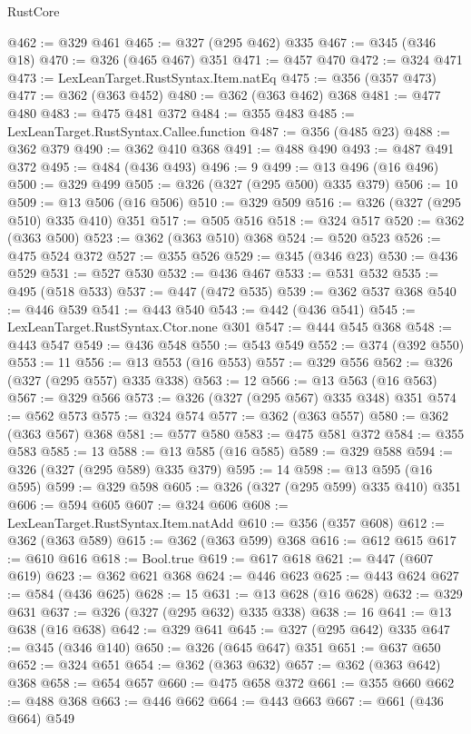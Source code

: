 \begin{lexlean}{RustCore}
\begin{coremodule}
@462 := @329 @461
@465 := @327 (@295 @462) @335
@467 := @345 (@346 @18)
@470 := @326 (@465 @467) @351
@471 := @457 @470
@472 := @324 @471
@473 := LexLeanTarget.RustSyntax.Item.natEq
@475 := @356 (@357 @473)
@477 := @362 (@363 @452)
@480 := @362 (@363 @462) @368
@481 := @477 @480
@483 := @475 @481 @372
@484 := @355 @483
@485 := LexLeanTarget.RustSyntax.Callee.function
@487 := @356 (@485 @23)
@488 := @362 @379
@490 := @362 @410 @368
@491 := @488 @490
@493 := @487 @491 @372
@495 := @484 (@436 @493)
@496 := 9
@499 := @13 @496 (@16 @496)
@500 := @329 @499
@505 := @326 (@327 (@295 @500) @335 @379)
@506 := 10
@509 := @13 @506 (@16 @506)
@510 := @329 @509
@516 := @326 (@327 (@295 @510) @335 @410) @351
@517 := @505 @516
@518 := @324 @517
@520 := @362 (@363 @500)
@523 := @362 (@363 @510) @368
@524 := @520 @523
@526 := @475 @524 @372
@527 := @355 @526
@529 := @345 (@346 @23)
@530 := @436 @529
@531 := @527 @530
@532 := @436 @467
@533 := @531 @532
@535 := @495 (@518 @533)
@537 := @447 (@472 @535)
@539 := @362 @537 @368
@540 := @446 @539
@541 := @443 @540
@543 := @442 (@436 @541)
@545 := LexLeanTarget.RustSyntax.Ctor.none @301
@547 := @444 @545 @368
@548 := @443 @547
@549 := @436 @548
@550 := @543 @549
@552 := @374 (@392 @550)
@553 := 11
@556 := @13 @553 (@16 @553)
@557 := @329 @556
@562 := @326 (@327 (@295 @557) @335 @338)
@563 := 12
@566 := @13 @563 (@16 @563)
@567 := @329 @566
@573 := @326 (@327 (@295 @567) @335 @348) @351
@574 := @562 @573
@575 := @324 @574
@577 := @362 (@363 @557)
@580 := @362 (@363 @567) @368
@581 := @577 @580
@583 := @475 @581 @372
@584 := @355 @583
@585 := 13
@588 := @13 @585 (@16 @585)
@589 := @329 @588
@594 := @326 (@327 (@295 @589) @335 @379)
@595 := 14
@598 := @13 @595 (@16 @595)
@599 := @329 @598
@605 := @326 (@327 (@295 @599) @335 @410) @351
@606 := @594 @605
@607 := @324 @606
@608 := LexLeanTarget.RustSyntax.Item.natAdd
@610 := @356 (@357 @608)
@612 := @362 (@363 @589)
@615 := @362 (@363 @599) @368
@616 := @612 @615
@617 := @610 @616
@618 := Bool.true
@619 := @617 @618
@621 := @447 (@607 @619)
@623 := @362 @621 @368
@624 := @446 @623
@625 := @443 @624
@627 := @584 (@436 @625)
@628 := 15
@631 := @13 @628 (@16 @628)
@632 := @329 @631
@637 := @326 (@327 (@295 @632) @335 @338)
@638 := 16
@641 := @13 @638 (@16 @638)
@642 := @329 @641
@645 := @327 (@295 @642) @335
@647 := @345 (@346 @140)
@650 := @326 (@645 @647) @351
@651 := @637 @650
@652 := @324 @651
@654 := @362 (@363 @632)
@657 := @362 (@363 @642) @368
@658 := @654 @657
@660 := @475 @658 @372
@661 := @355 @660
@662 := @488 @368
@663 := @446 @662
@664 := @443 @663
@667 := @661 (@436 @664) @549

\end{coremodule}
\end{lexlean}
